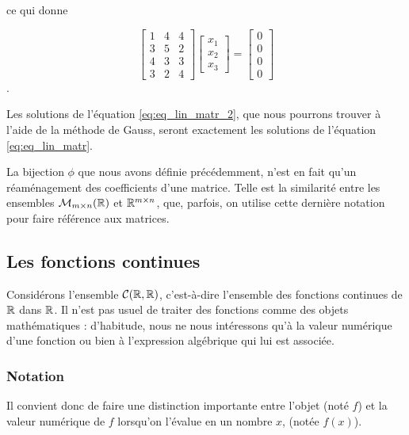 ce qui donne

\begin{equation} \label{eq:eq_lin_matr_2}
    \begin{bmatrix}
    1 & 4 & 4\\
    3 & 5 & 2\\
    4 & 3 & 3\\
    3 & 2 & 4
    \end{bmatrix}
    \begin{bmatrix}
    x_1\\x_2\\x_3
    \end{bmatrix} = \begin{bmatrix}0\\0\\0\\0\end{bmatrix}
\end{equation}.

Les solutions de l'équation \ref{eq:eq_lin_matr_2}, que nous pourrons trouver à l'aide de la méthode de Gauss, seront exactement les solutions de l'équation \ref{eq:eq_lin_matr}.

La bijection $\phi$ que nous avons définie précédemment, n'est en fait qu'un réaménagement des coefficients d'une matrice. Telle est la similarité entre les ensembles $\mathcal{M}_{m \times n}(\mathbb{R})$ et $\mathbb{R}^{m \times n}$, que, parfois, on utilise cette dernière notation pour faire référence aux matrices.

\subsection{Les fonctions continues}

Considérons l'ensemble $\mathcal{C}(\mathbb{R},\mathbb{R})$, c'est-à-dire l'ensemble des fonctions continues de $\mathbb{R}$ dans $\mathbb{R}$. Il n'est pas usuel de traiter des fonctions comme des objets mathématiques : d'habitude, nous ne nous intéressons qu'à la valeur numérique d'une fonction ou bien à l'expression algébrique qui lui est associée.

\subsubsection{Notation}
Il convient donc de faire une distinction importante entre l'objet (noté $f$) et la valeur numérique de $f$ lorsqu'on l'évalue en un nombre $x$, (notée $f(x)$).

